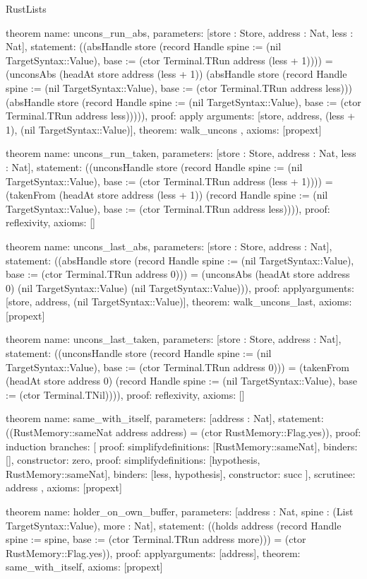 \begin{lexlean}{RustLists}
\begin{semanticmodule}
theorem{
  name: uncons_run_abs,
  parameters: [store : Store, address : Nat, less : Nat],
  statement: ((absHandle store (record Handle {spine := (nil TargetSyntax::Value), base := (ctor Terminal.TRun address (less + 1))})) = (unconsAbs (headAt store address (less + 1)) (absHandle store (record Handle {spine := (nil TargetSyntax::Value), base := (ctor Terminal.TRun address less)})) (absHandle store (record Handle {spine := (nil TargetSyntax::Value), base := (ctor Terminal.TRun address less)})))),
  proof: apply{
    arguments: [store, address, (less + 1), (nil TargetSyntax::Value)],
    theorem: walk_uncons
  },
  axioms: [propext]
}

theorem{
  name: uncons_run_taken,
  parameters: [store : Store, address : Nat, less : Nat],
  statement: ((unconsHandle store (record Handle {spine := (nil TargetSyntax::Value), base := (ctor Terminal.TRun address (less + 1))})) = (takenFrom (headAt store address (less + 1)) (record Handle {spine := (nil TargetSyntax::Value), base := (ctor Terminal.TRun address less)}))),
  proof: reflexivity{},
  axioms: []
}

theorem{
  name: uncons_last_abs,
  parameters: [store : Store, address : Nat],
  statement: ((absHandle store (record Handle {spine := (nil TargetSyntax::Value), base := (ctor Terminal.TRun address 0)})) = (unconsAbs (headAt store address 0) (nil TargetSyntax::Value) (nil TargetSyntax::Value))),
  proof: apply{arguments: [store, address, (nil TargetSyntax::Value)], theorem: walk_uncons_last},
  axioms: [propext]
}

theorem{
  name: uncons_last_taken,
  parameters: [store : Store, address : Nat],
  statement: ((unconsHandle store (record Handle {spine := (nil TargetSyntax::Value), base := (ctor Terminal.TRun address 0)})) = (takenFrom (headAt store address 0) (record Handle {spine := (nil TargetSyntax::Value), base := (ctor Terminal.TNil)}))),
  proof: reflexivity{},
  axioms: []
}

theorem{
  name: same_with_itself,
  parameters: [address : Nat],
  statement: ((RustMemory::sameNat address address) = (ctor RustMemory::Flag.yes)),
  proof: induction{
    branches: [
      {proof: simplify{definitions: [RustMemory::sameNat]}, binders: [], constructor: zero},
      {
        proof: simplify{definitions: [hypothesis, RustMemory::sameNat]},
        binders: [less, hypothesis],
        constructor: succ
      }
    ],
    scrutinee: address
  },
  axioms: [propext]
}

theorem{
  name: holder_on_own_buffer,
  parameters: [address : Nat, spine : (List TargetSyntax::Value), more : Nat],
  statement: ((holds address (record Handle {spine := spine, base := (ctor Terminal.TRun address more)})) = (ctor RustMemory::Flag.yes)),
  proof: apply{arguments: [address], theorem: same_with_itself},
  axioms: [propext]
}


\end{semanticmodule}
\end{lexlean}
